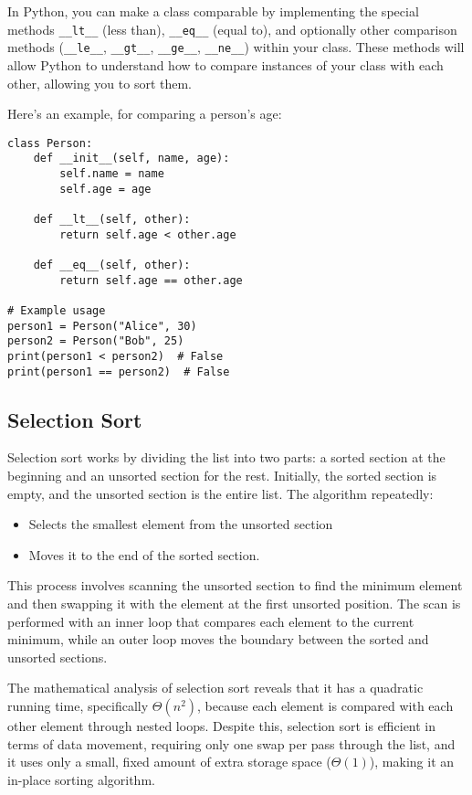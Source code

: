 \documentclass{article}
\begin{document}
In Python, you can make a class comparable by implementing the special methods \verb|__lt__| (less than), \verb|__eq__| (equal to), and optionally other comparison methods (\verb|__le__|, \verb|__gt__|, \verb|__ge__|, \verb|__ne__|) within your class. These methods will allow Python to understand how to compare instances of your class with each other, allowing you to sort them.

Here's an example, for comparing a person's age:

\begin{verbatim}
class Person:
    def __init__(self, name, age):
        self.name = name
        self.age = age

    def __lt__(self, other):
        return self.age < other.age

    def __eq__(self, other):
        return self.age == other.age

# Example usage
person1 = Person("Alice", 30)
person2 = Person("Bob", 25)
print(person1 < person2)  # False
print(person1 == person2)  # False
\end{verbatim}

\subsection{Selection Sort}


Selection sort works by dividing the list into two parts: a sorted section at the beginning and an unsorted section for the rest. Initially, the sorted section is empty, and the unsorted section is the entire list. The algorithm repeatedly:

\begin{itemize}
    \item Selects the smallest element from the unsorted section
    \item Moves it to the end of the sorted section.
\end{itemize}

This process involves scanning the unsorted section to find the minimum element and then swapping it with the element at the first unsorted position. The scan is performed with an inner loop that compares each element to the current minimum, while an outer loop moves the boundary between the sorted and unsorted sections.
 
The mathematical analysis of selection sort reveals that it has a quadratic running time, specifically $\Theta(n^2)$, because each element is compared with each other element through nested loops. Despite this, selection sort is efficient in terms of data movement, requiring only one swap per pass through the list, and it uses only a small, fixed amount of extra storage space ($\Theta(1)$), making it an in-place sorting algorithm.
\end{document}
